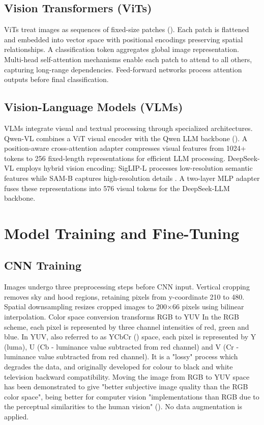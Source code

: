 \subsection{Vision Transformers (ViTs)} 
ViTs treat images as sequences of fixed-size patches (\cite{dosovitskiy2021image}). Each patch is flattened and embedded into vector space with positional encodings preserving spatial relationships. A classification token aggregates global image representation. Multi-head self-attention mechanisms enable each patch to attend to all others, capturing long-range dependencies. Feed-forward networks process attention outputs before final classification.

\subsection{Vision-Language Models (VLMs)} 
VLMs integrate visual and textual processing through specialized architectures. Qwen-VL combines a ViT visual encoder with the Qwen LLM backbone (\cite{bai2023qwen}). A position-aware cross-attention adapter compresses visual features from 1024+ tokens to 256 fixed-length representations for efficient LLM processing. DeepSeek-VL employs hybrid vision encoding: SigLIP-L processes low-resolution semantic features while SAM-B captures high-resolution details \cite{zeng2024deepseek}. A two-layer MLP adapter fuses these representations into 576 visual tokens for the DeepSeek-LLM backbone.


\section{Model Training and Fine-Tuning}


\subsection{CNN Training}
Images undergo three preprocessing steps before CNN input. Vertical cropping removes sky and hood regions, retaining pixels from y-coordinate 210 to 480. Spatial downsampling resizes cropped images to 200×66 pixels using bilinear interpolation. Color space conversion transforms RGB to YUV \cite{lecun2004dave, bojarski2016end} In the RGB scheme, each pixel is represented by three channel intensities of red, green and blue. In YUV, also referred to as YCbCr (\cite{maller2020}) space, each pixel is represented by Y (luma), U (Cb - luminance value subtracted from red channel) and V (Cr - luminance value subtracted from red channel). It is a "lossy" process which degrades the data, and originally developed for colour to black and white television backward compatibility. Moving the image from RGB to YUV space has been demonstrated to give "better subjective image quality than the RGB color space", being better for computer vision "implementations than RGB due to the perceptual similarities to the human vision" (\cite{podpora2014yuv}). No data augmentation is applied. 

